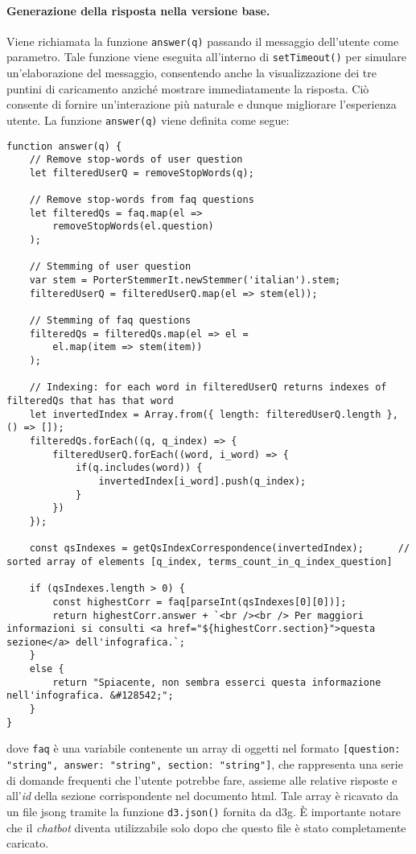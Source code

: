 \paragraph{Generazione della risposta nella versione base.} Viene richiamata la funzione \texttt{answer(q)} passando il messaggio dell'utente come parametro. Tale funzione viene eseguita all'interno di \texttt{setTimeout()} per simulare un'elaborazione 
del messaggio, consentendo anche la visualizzazione dei tre puntini di caricamento anziché mostrare immediatamente la risposta. Ciò consente di fornire un'interazione più naturale e dunque migliorare l'esperienza utente.
La funzione \texttt{answer(q)} viene definita come segue:
\begin{lstlisting}[style=std]
function answer(q) {   
    // Remove stop-words of user question
    let filteredUserQ = removeStopWords(q);

    // Remove stop-words from faq questions
    let filteredQs = faq.map(el => 
        removeStopWords(el.question)
    );

    // Stemming of user question
    var stem = PorterStemmerIt.newStemmer('italian').stem;
    filteredUserQ = filteredUserQ.map(el => stem(el));

    // Stemming of faq questions
    filteredQs = filteredQs.map(el => el =
        el.map(item => stem(item))
    );

    // Indexing: for each word in filteredUserQ returns indexes of filteredQs that has that word
    let invertedIndex = Array.from({ length: filteredUserQ.length }, () => []);
    filteredQs.forEach((q, q_index) => {
        filteredUserQ.forEach((word, i_word) => {
            if(q.includes(word)) {
                invertedIndex[i_word].push(q_index);
            }
        })
    });

    const qsIndexes = getQsIndexCorrespondence(invertedIndex);      // sorted array of elements [q_index, terms_count_in_q_index_question]

    if (qsIndexes.length > 0) {
        const highestCorr = faq[parseInt(qsIndexes[0][0])];
        return highestCorr.answer + `<br /><br /> Per maggiori informazioni si consulti <a href="${highestCorr.section}">questa sezione</a> dell'infografica.`;
    }
    else {
        return "Spiacente, non sembra esserci questa informazione nell'infografica. &#128542;";
    }
}
\end{lstlisting}
dove \texttt{faq} è una variabile contenente un array di oggetti nel formato \texttt{[{question: "string", answer: "string", section: "string"}]}, che rappresenta una serie di domande frequenti che l'utente potrebbe fare, 
assieme alle relative risposte e all'\emph{id} della sezione corrispondente nel documento \gls{html}. Tale array è ricavato da un file \gls{jsong} tramite la funzione \texttt{d3.json()} fornita da \gls{d3g}. 
È importante notare che il \emph{chatbot} diventa utilizzabile solo dopo che questo file è stato completamente caricato.

